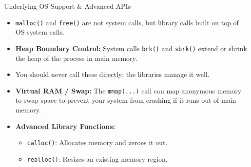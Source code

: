 \documentclass{beamer}
\begin{document}
\begin{frame}[fragile]{Underlying OS Support \& Advanced APIs}
    \begin{itemize}
        \item \texttt{malloc()} and \texttt{free()} are not system calls, but library calls built on top of OS system calls. %
        \item \textbf{Heap Boundary Control:} System calls \texttt{brk()} and \texttt{sbrk()} extend or shrink the heap of the process in main memory. %
        \item You should never call these directly; the libraries manage it well. %
        \item \textbf{Virtual RAM / Swap:} The \texttt{mmap(...)} call can map anonymous memory to swap space to prevent your system from crashing if it runs out of main memory. %
        \item \textbf{Advanced Library Functions:}
        \begin{itemize}
            \item \texttt{calloc()}: Allocates memory and zeroes it out. %
            \item \texttt{realloc()}: Resizes an existing memory region. %
        \end{itemize}
    \end{itemize}
\end{frame}
\end{document}
